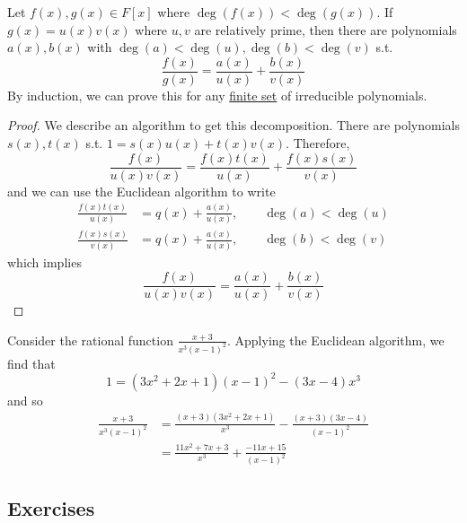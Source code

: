   \begin{theorem}
    \label{thm:partial-fractions-decomposition}
    Let $f(x), g(x) \in F[x]$ where $\deg(f(x)) < \deg(g(x))$. If $g(x) = u(x) v(x)$ where $u, v$ are relatively prime, then there are polynomials $a(x), b(x)$ with $\deg(a) < \deg(u), \deg(b) < \deg(v)$ s.t. 
    \begin{equation}
      \frac{f(x)}{g(x)} = \frac{a(x)}{u(x)} + \frac{b(x)}{v(x)}
    \end{equation}
    By induction, we can prove this for any \hyperref[st-def:finite-set]{finite set} of irreducible polynomials. 
  \end{theorem}
  \begin{proof}
    We describe an algorithm to get this decomposition. There are polynomials $s(x), t(x)$ s.t. $1 = s(x) u(x) + t(x) v(x)$. Therefore, 
    \begin{equation}
      \frac{f(x)}{ u(x) v(x)} = \frac{f(x) t(x)}{u(x)} + \frac{f(x) s(x)}{v(x)}
    \end{equation}
    and we can use the Euclidean algorithm to write 
    \begin{align}
      \frac{f(x) t(x)}{u(x)} & = q(x) + \frac{a(x)}{u(x)}, \qquad \deg(a) < \deg(u) \\
      \frac{f(x) s(x)}{v(x)} & = q(x) + \frac{a(x)}{u(x)}, \qquad \deg(b) < \deg(v)
    \end{align}
    which implies 
    \begin{equation}
      \frac{f(x)}{u(x) v(x)} = \frac{a(x)}{u(x)} + \frac{b(x)}{v(x)}
    \end{equation}
  \end{proof}

  \begin{example}
    \label{ex:partial-fractions-via-the-euclidean-algorithm}
    Consider the rational function $\frac{x + 3}{x^3 (x - 1)^2}$. Applying the Euclidean algorithm, we find that 
    \begin{equation}
      1 = (3x^2 + 2x + 1) (x - 1)^2 - (3x - 4) x^3
    \end{equation}
    and so 
    \begin{align}
      \frac{x + 3}{x^3 (x - 1)^2} & = \frac{(x + 3)(3x^2 + 2x + 1)}{x^3} - \frac{(x + 3)(3x - 4)}{(x - 1)^2} \\
                                  & = \frac{11x^2 + 7x + 3}{x^3} + \frac{-11x + 15}{(x - 1)^2}
    \end{align}
  \end{example}

\subsection{Exercises}
